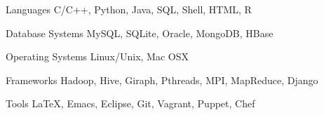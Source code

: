 

\begin{cvskills}

  \cvskill
    {Languages} %
    {C/C++, Python, Java, SQL, Shell, HTML, R} %

  \cvskill
    {Database Systems} %
    {MySQL, SQLite, Oracle, MongoDB, HBase} %

  \cvskill
    {Operating Systems} %
    {Linux/Unix, Mac OSX}

  \cvskill
    {Frameworks} %
    {Hadoop, Hive, Giraph, Pthreads, MPI, MapReduce, Django}

  \cvskill
    {Tools} %
    {\LaTeX, Emacs, Eclipse, Git, Vagrant, Puppet, Chef} %

\end{cvskills}
